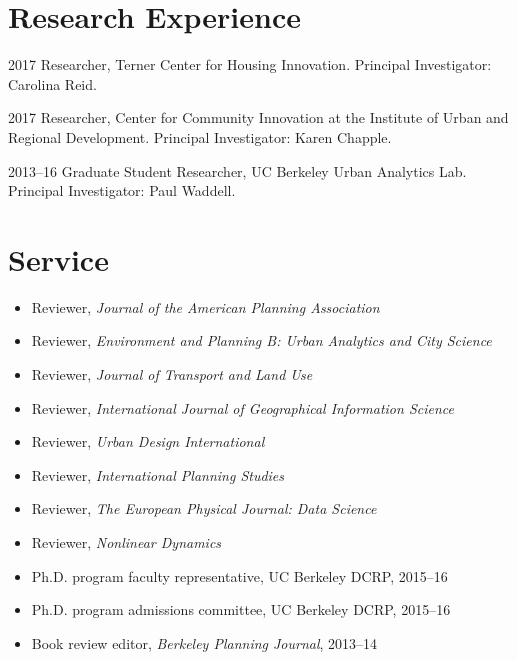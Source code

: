 \documentclass{academiccv}
\begin{document}
\section*{Research Experience}

\begin{tablist}
	
\item[2017] 	\tab Researcher, Terner Center for Housing Innovation. Principal Investigator: Carolina Reid.

\item[2017] 	\tab Researcher, Center for Community Innovation at the Institute of Urban and Regional Development. Principal Investigator: Karen Chapple.

\item[2013--16] \tab Graduate Student Researcher, UC Berkeley Urban Analytics Lab. Principal Investigator: Paul Waddell.

\end{tablist}



\section*{Service}

\begin{itemize}

\item Reviewer, \textit{Journal of the American Planning Association}

\item Reviewer, \textit{Environment and Planning B: Urban Analytics and City Science}

\item Reviewer, \textit{Journal of Transport and Land Use}

\item Reviewer, \textit{International Journal of Geographical Information Science}

\item Reviewer, \textit{Urban Design International}

\item Reviewer, \textit{International Planning Studies}

\item Reviewer, \textit{The European Physical Journal: Data Science}

\item Reviewer, \textit{Nonlinear Dynamics}

\item Ph.D. program faculty representative, UC Berkeley DCRP, 2015--16

\item Ph.D. program admissions committee, UC Berkeley DCRP, 2015--16

\item Book review editor, \textit{Berkeley Planning Journal}, 2013--14

\end{itemize}
\end{document}
